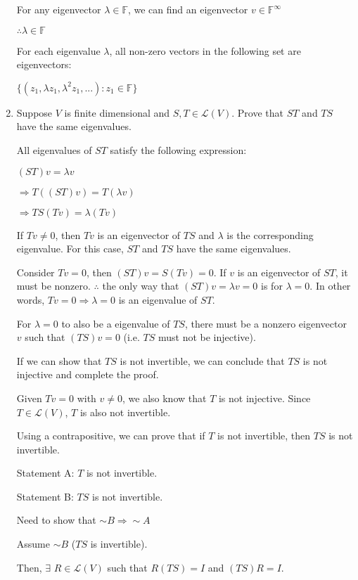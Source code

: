 \documentclass[fleqn]{article}
\begin{document}
\begin{enumerate}[nolistsep]
				For any eigenvector $\lambda \in \mathbb{F}$, we can find an eigenvector $v \in \mathbb{F}^\infty$
				 
				 $\therefore \lambda \in \mathbb{F}$
				 
				 For each eigenvalue $\lambda$, all non-zero vectors in the following set are eigenvectors:
				 
				 $\{(z_1,{\lambda}z_1,{\lambda}^2z_1, ...) : z_1 \in \mathbb{F}\}$
				 
			\item Suppose $V$ is finite dimensional and $S,T \in \mathcal{L}(V)$. Prove that $ST$ and $TS$ have the same eigenvalues.
			
			\pagebreak
			All eigenvalues of $ST$ satisfy the following expression:
			
			$(ST)v = {\lambda}v$
			
			$\Rightarrow T((ST)v) = T({\lambda}v)$
			
			$\Rightarrow TS(Tv) = \lambda(Tv)$
			
			If $Tv \neq 0$, then $Tv$ is an eigenvector of $TS$ and $\lambda$ is the corresponding eigenvalue. For this case, $ST$ and $TS$ have the same eigenvalues.
			
			Consider $Tv = 0$, then $(ST)v = S(Tv) = 0$. If $v$ is an eigenvector of $ST$, it must be nonzero. $\therefore$ the only way that $(ST)v = {\lambda}v = 0$ is for $\lambda = 0$. In other words, $Tv = 0 \Rightarrow \lambda = 0$ is an eigenvalue of $ST$.
			
			For $\lambda = 0$ to also be a eigenvalue of $TS$, there must be a nonzero eigenvector $v$ such that $(TS)v = 0$ (i.e. $TS$ must not be injective).
			
			If we can show that $TS$ is not invertible, we can conclude that $TS$ is not injective and complete the proof.
			
			Given $Tv = 0$ with $v \neq 0$, we also know that $T$ is not injective. Since $T \in \mathcal{L}(V)$, $T$ is also not invertible. 
			
			Using a contrapositive, we can prove that if $T$ is not invertible, then $TS$ is not invertible.
			
			Statement A: $T$ is not invertible.
			
			Statement B: $TS$ is not invertible.
			
			Need to show that ${\sim}B \Rightarrow {\sim}A$
			
			Assume ${\sim}B$ ($TS$ is invertible).
			
			Then, $\exists$ $R \in \mathcal{L}(V)$ such that $R(TS) = I$ and $(TS)R = I$.
			

\end{enumerate}
\end{document}
